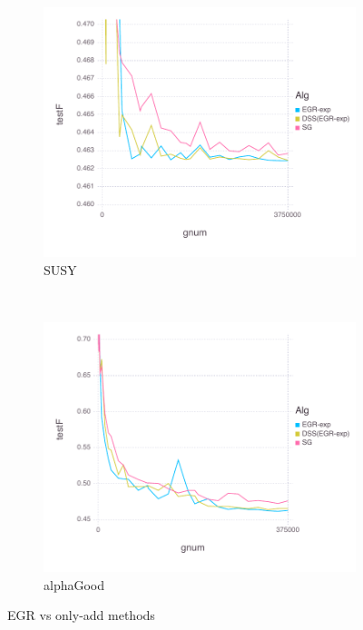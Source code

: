 \documentclass[11pt]{article}
\begin{document}
\begin{figure}[H]
       \begin{subfigure}[b]{0.45\textwidth}
           \includegraphics[width=\textwidth]{Figures/SUSYBLtrueFfFinal-dss.pdf}
           \caption{SUSY}
       \end{subfigure}
       ~ %
         \begin{subfigure}[b]{0.45\textwidth}
           \includegraphics[width=\textwidth]{Figures/alphaGoodBLtrueFfFinal-dss.pdf}
             \caption{alphaGood}
         \end{subfigure}
       \caption{EGR vs only-add methods}\label{fig:SUSYoa}
   \end{figure}
   
\end{document}
